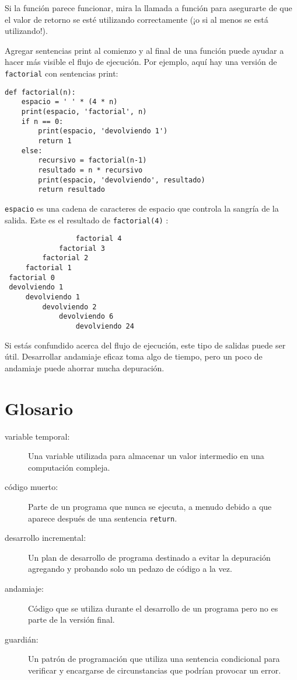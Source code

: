 \documentclass[10pt]{book}
\begin{document}
Si la función parece funcionar, mira la llamada a función
para asegurarte de que el valor de retorno se esté utilizando correctamente (¡o si al
menos se está utilizando!).

Agregar sentencias print al comienzo y al final de una función
puede ayudar a hacer más visible el flujo de ejecución.
Por ejemplo, aquí hay una versión de {\tt factorial} con
sentencias print:

\begin{verbatim}
def factorial(n):
    espacio = ' ' * (4 * n)
    print(espacio, 'factorial', n)
    if n == 0:
        print(espacio, 'devolviendo 1')
        return 1
    else:
        recursivo = factorial(n-1)
        resultado = n * recursivo
        print(espacio, 'devolviendo', resultado)
        return resultado
\end{verbatim}
%
{\tt espacio} es una cadena de caracteres de espacio que controla la
sangría de la salida.  Este es el resultado de {\tt factorial(4)} :

\begin{verbatim}
                 factorial 4
             factorial 3
         factorial 2
     factorial 1
 factorial 0
 devolviendo 1
     devolviendo 1
         devolviendo 2
             devolviendo 6
                 devolviendo 24
\end{verbatim}
%
Si estás confundido acerca del flujo de ejecución, este tipo de
salidas puede ser útil.  Desarrollar andamiaje eficaz toma algo de
tiempo, pero un poco de andamiaje puede ahorrar mucha depuración.


\section{Glosario}

\begin{description}

\item[variable temporal:]  Una variable utilizada para almacenar un valor intermedio en
una computación compleja.

\item[código muerto:]  Parte de un programa que nunca se ejecuta, a menudo debido a que
aparece después de una sentencia {\tt return}.

\item[desarrollo incremental:]  Un plan de desarrollo de programa destinado a
evitar la depuración agregando y probando solo
un pedazo de código a la vez.

\item[andamiaje:]  Código que se utiliza durante el desarrollo de un programa pero
no es parte de la versión final.

\item[guardián:]  Un patrón de programación que utiliza una sentencia
condicional para verificar y encargarse de circunstancias que
podrían provocar un error.

\end{description}
\end{document}
